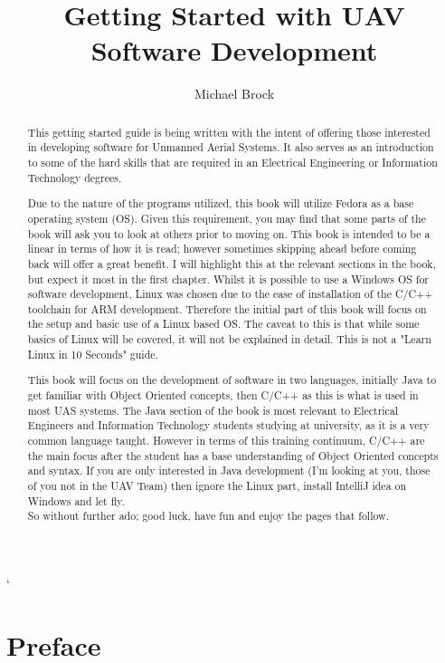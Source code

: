 `\documentclass[a4paper,11pt]{report}
\author{Michael Brock}
\title{Getting Started with UAV Software Development}
\begin{document}
\maketitle
\tableofcontents
\begin{abstract}
  This getting started guide is being written with the intent of offering those interested in developing software for Unmanned Aerial Systems.
  It also serves as an introduction to some of the hard skills that are required in an Electrical Engineering or Information Technology degrees.

  Due to the nature of the programs utilized, this book will utilize Fedora as a base operating system (OS).
	Given this requirement, you may find that some parts of the book will ask you to look at others prior to moving on.
	This book is intended to be a linear in terms of how it is read; however sometimes skipping ahead before coming back will offer a great benefit.
	I will highlight this at the relevant sections in the book, but expect it most in the first chapter.
  Whilst it is possible to use a Windows OS for software development, Linux was chosen due to the ease of installation of the C/C++ toolchain for ARM development.
  Therefore the initial part of this book will focus on the setup and basic use of a Linux based OS.
	The caveat to this is that while some basics of Linux will be covered, it will not be explained in detail. This is not a "Learn Linux in 10 Seconds" guide.

  This book will focus on the development of software in two languages, initially Java to get familiar with Object Oriented concepts, then C/C++ as this is what is used in most UAS systems.
  The Java section of the book is most relevant to Electrical Engineers and Information Technology students studying at university, as it is a very common language taught.
  However in terms of this training continuum, C/C++ are the main focus after the student has a base understanding of Object Oriented concepts and syntax.
	If you are only interested in Java development (I'm looking at you, those of you not in the UAV Team) then ignore the Linux part, install IntelliJ idea on Windows and let fly. \\

  So without further ado; good luck, have fun and enjoy the pages that follow.

\end{abstract}

\chapter*{Preface}
\end{document}

